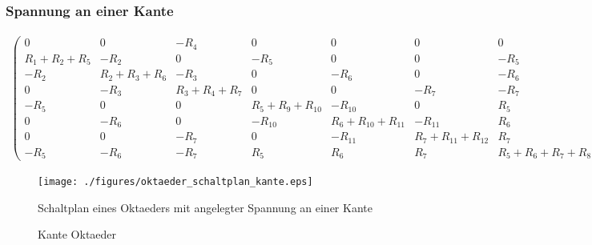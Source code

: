 \documentclass[10pt,a4paper]{article}
\begin{document}
\begin{landscape}
\subsubsection{Spannung an einer Kante}

\begin{align}
\begin{pmatrix}
	0 & 0 & -R_4 & 0 & 0 & 0 & 0 & R_4 \\
	R_1 + R_2 + R_5 & -R_2 & 0 & -R_5 & 0 & 0 &-R_5 & 0 \\
	-R_2 & R_2 + R_3 + R_6 & -R_3 & 0 & -R_6 & 0 & -R_6 & 0 \\
	0 & -R_3 & R_3 + R_4 + R_7 & 0 & 0 & -R_7 & -R_7 & -R_4 \\
	-R_5 & 0 & 0 & R_5 + R_9 + R_{10} & -R_{10} & 0 & R_5 & 0 \\
	0 & -R_6 & 0 & -R_{10} & R_6 + R_{10} + R_{11} & -R_{11} & R_6 & 0 \\
	0 & 0 & -R_7 & 0 & -R_{11} & R_7 + R_{11} + R_{12} & R_7 & 0 \\
	-R_5 & -R_6 & -R_7 & R_5 & R_6 & R_7 & R_5 + R_6 + R_7 + R_8 & 0
\end{pmatrix}
\begin{pmatrix}
I_1\\ I_2\\ I_3\\I_4\\I_5\\I_6\\I_7\\I_{ges}
\end{pmatrix}
=
\begin{pmatrix}
U\\0\\0\\0\\0\\0\\0\\0
\end{pmatrix}
\end{align}
\thispagestyle{empty}
\begin{figure}[htbp!]
\centering
\texttt{[image: ./figures/oktaeder\_schaltplan\_kante.eps]}
\caption{Schaltplan eines Oktaeders mit angelegter Spannung an einer Kante}
\label{fig:oktaeder_schaltplan_kante}
\end{figure}
\end{landscape}
\newpage
\begin{figure}[htbp!]
\centering

\caption{Kante Oktaeder}
\end{figure}
\thispagestyle{empty}
\end{document}
